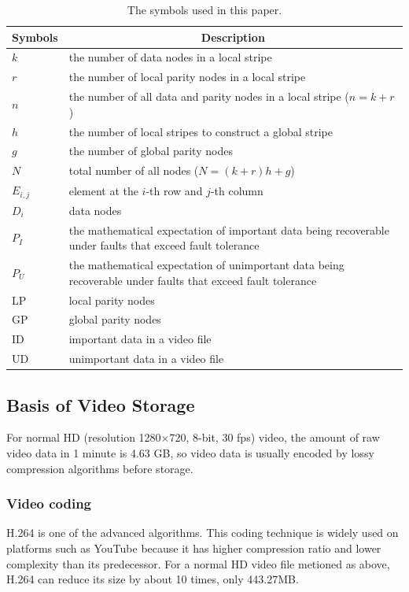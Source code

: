\documentclass[sigconf]{acmart}
\begin{document}
\begin{table}[]
\caption{The symbols used in this paper.}\label{parameter}
\centering\small
\begin{tabular}{|p{1cm}<{\centering}|p{6.5cm}|}
\hline
Symbols & \multicolumn{1}{c|}{Description} \\ \hline \hline
$k$ & the number of data nodes in a local stripe \\ \hline
$r$ & the number of local parity nodes in a local stripe \\ \hline
$n$ & the number of all data and parity nodes in a local stripe ($n=k+r$) \\ \hline
$h$ & the number of local stripes to construct a global stripe \\ \hline
$g$ & the number of global parity nodes \\ \hline
$N$ & total number of all nodes ($N=(k+r)h+g$) \\ \hline
$E_{i,j}$ & element at the $i$-th row and $j$-th column \\ \hline
$D_i$ & data nodes \\ \hline
$P_{I}$ & the mathematical expectation of important data being recoverable under faults that exceed fault tolerance \\ \hline
$P_{U}$ & the mathematical expectation of unimportant data being recoverable under faults that exceed fault tolerance \\ \hline
LP & local parity nodes \\ \hline
GP & global parity nodes \\ \hline
ID & important data in a video file \\ \hline
UD & unimportant data in a video file \\ \hline
\end{tabular}
\end{table}


\subsection{Basis of Video Storage}\label{video storage}
For normal HD (resolution 1280$\times$720, 8-bit, 30 fps) video, the amount of raw video data in 1 minute is 4.63 GB, so video data is usually encoded by lossy compression algorithms before storage.

\subsubsection{Video coding}
H.264 \cite{wiegand2003overview} is one of the advanced algorithms. This coding technique is widely used on platforms such as YouTube because it has higher compression ratio and lower complexity than its predecessor. For a normal HD video file metioned as above, H.264 can reduce its size by about 10 times, only 443.27MB.
\end{document}
